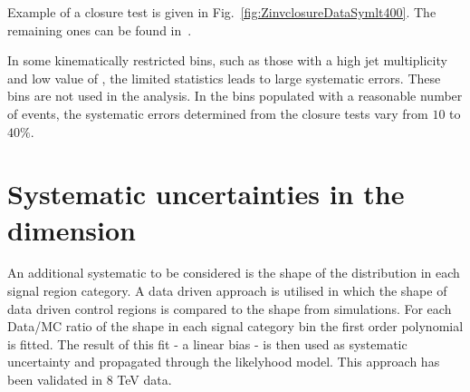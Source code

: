 Example of a closure test is given in Fig.~\ref{fig:ZinvclosureDataSymlt400}. The remaining ones can be found in~\cite{alphaTnote}.


In some kinematically restricted bins, such as those with a high jet multiplicity and low value of \scalht, the
limited statistics leads to large systematic errors. These bins are not used in the analysis. 
In the bins populated with a reasonable number of events, the systematic errors determined from the closure tests vary from $10$ to
$40\%$.


\section{Systematic uncertainties in the \mht dimension}

An additional systematic to be considered is the shape of the \mht distribution in each signal region category. 
A data driven approach is utilised in which the shape of data driven control regions is compared to the \mht shape from simulations.
For each Data/MC ratio of the shape in each signal category bin the first order polynomial is fitted. The result of this fit - a linear bias - 
is then used as systematic uncertainty and propagated through the likelyhood model.
This approach has been validated in 8 TeV data. 




